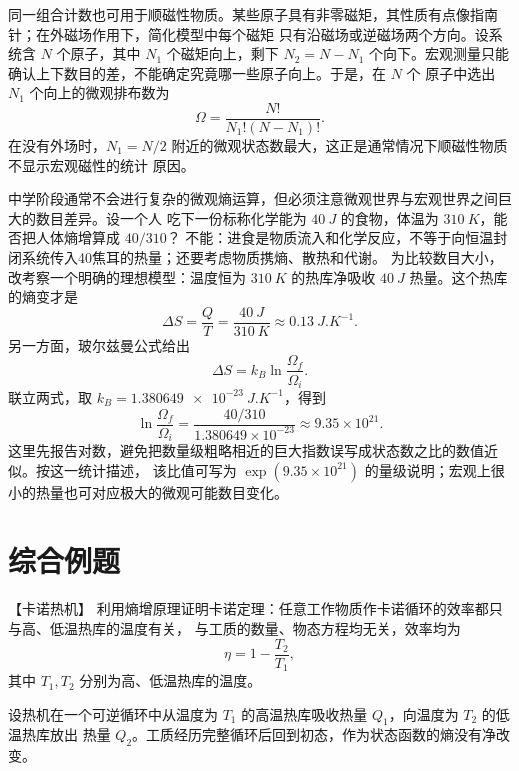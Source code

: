 {同一组合计数也可用于顺磁性物质。某些原子具有非零磁矩，其性质有点像指南针；在外磁场作用下，简化模型中每个磁矩
只有沿磁场或逆磁场两个方向。设系统含 $N$ 个原子，其中 $N_1$ 个磁矩向上，剩下
$N_2=N-N_1$ 个向下。宏观测量只能确认上下数目的差，不能确定究竟哪一些原子向上。于是，在 $N$ 个
原子中选出 $N_1$ 个向上的微观排布数为
\begin{equation}
  \boxed{\Omega=\frac{N!}{N_1!(N-N_1)!}}.
\end{equation}
在没有外场时，$N_1=N/2$ 附近的微观状态数最大，这正是通常情况下顺磁性物质不显示宏观磁性的统计
原因。

中学阶段通常不会进行复杂的微观熵运算，但必须注意微观世界与宏观世界之间巨大的数目差异。设一个人
吃下一份标称化学能为 $\SI{40}{J}$ 的食物，体温为 $\SI{310}{K}$，能否把人体熵增算成 $40/310$？
不能：进食是物质流入和化学反应，不等于向恒温封闭系统传入40焦耳的热量；还要考虑物质携熵、散热和代谢。
为比较数目大小，改考察一个明确的理想模型：温度恒为 $\SI{310}{K}$ 的热库净吸收
$\SI{40}{J}$ 热量。这个热库的熵变才是
\[
  \Delta S=\frac{Q}{T}
  =\frac{\SI{40}{J}}{\SI{310}{K}}
  \approx\SI{0.13}{J.K^{-1}}.
\]
另一方面，玻尔兹曼公式给出
\[
  \Delta S=k_B\ln\frac{\Omega_f}{\Omega_i}.
\]
联立两式，取 $k_B=\SI{1.380649e-23}{J.K^{-1}}$，得到
\begin{equation}
  \boxed{\ln\frac{\Omega_f}{\Omega_i}
  =\frac{40/310}{1.380649\times10^{-23}}
  \approx9.35\times10^{21}}.
\end{equation}
这里先报告对数，避免把数量级粗略相近的巨大指数误写成状态数之比的数值近似。按这一统计描述，
该比值可写为 $\exp(9.35\times10^{21})$ 的量级说明；宏观上很小的热量也可对应极大的微观可能数目变化。


\section{综合例题}
\begin{origexamplebox}{【卡诺热机】}\label{ch16:ex:s30-21-1}
利用熵增原理证明卡诺定理：任意工作物质作卡诺循环的效率都只与高、低温热库的温度有关，
与工质的数量、物态方程均无关，效率均为
\[
  \eta=1-\frac{T_2}{T_1},
\]
其中 $T_1,T_2$ 分别为高、低温热库的温度。

\ThQCarnot
\end{origexamplebox}\par\nopagebreak[4]

\par\nopagebreak[4]\begin{xesolution}
设热机在一个可逆循环中从温度为 $T_1$ 的高温热库吸收热量 $Q_1$，向温度为 $T_2$ 的低温热库放出
热量 $Q_2$。工质经历完整循环后回到初态，作为状态函数的熵没有净改变。


\end{xesolution}}
